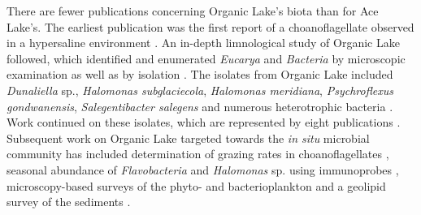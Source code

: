 There are fewer publications concerning Organic Lake's biota than for Ace Lake's.
The earliest publication was the first report of a choanoflagellate observed in a hypersaline environment \cite{vandenHoff1986}.
An in-depth limnological study of Organic Lake followed, which identified and enumerated \emph{Eucarya} and \emph{Bacteria} by microscopic examination as well as by isolation \cite{Franzmann1987b}.
The isolates from Organic Lake included \emph{Dunaliella} sp., \emph{Halomonas subglaciecola}, \emph{Halomonas meridiana}, \emph{Psychroflexus gondwanensis}, \emph{Salegentibacter salegens} and numerous heterotrophic bacteria \cite{Franzmann1987b}.
Work continued on these isolates, which are represented by eight publications \cite{Burch1983, Franzmann1987a, McMeekin1988b, James1990, Dobson1991, Dobson1993, Bowman1998, McCammon2000}.
Subsequent work on Organic Lake targeted towards the \emph{in situ} microbial community has included determination of grazing rates in choanoflagellates \cite{Marchant1993}, seasonal abundance of \emph{Flavobacteria} and \emph{Halomonas} sp. using immunoprobes \cite{James1994},  microscopy-based surveys of the phyto- and bacterioplankton \cite{Roberts1996, Perriss1997} and a geolipid survey of the sediments \cite{Rogerson1996}.

